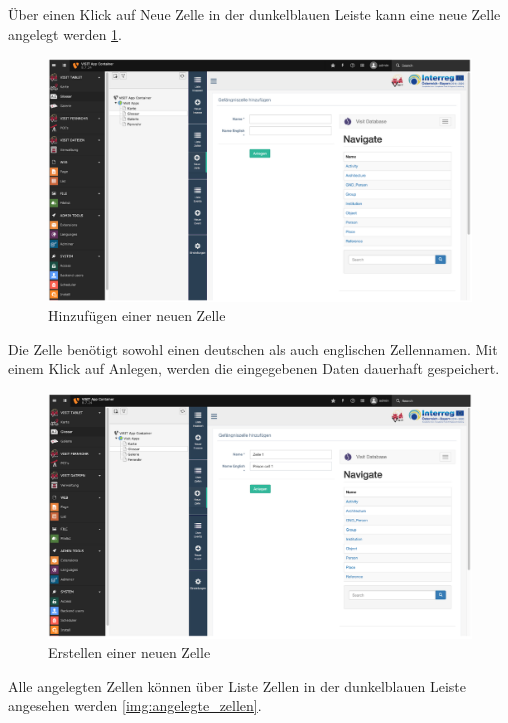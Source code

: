 Über einen Klick auf Neue Zelle in der dunkelblauen Leiste kann eine neue Zelle angelegt werden \ref{img:hinzufuegen_neue_zelle}.

\begin{figure}[ht!]
\centering
\includegraphics[width=12cm]{Figures/paula/glossar/hinzufuegen_neue_zelle.png}
\caption{Hinzufügen einer neuen Zelle}
\label{img:hinzufuegen_neue_zelle}
\end{figure}

Die Zelle benötigt sowohl einen deutschen als auch englischen Zellennamen. Mit einem Klick auf Anlegen, werden die eingegebenen Daten dauerhaft gespeichert. 
\begin{figure}[ht!]
\centering
\includegraphics[width=12cm]{Figures/paula/glossar/neue_zelle_erstellen.png}
\caption{Erstellen einer neuen Zelle}
\label{img:neue_zelle}
\end{figure}

Alle angelegten Zellen können über Liste Zellen in der dunkelblauen Leiste angesehen werden \ref{img:angelegte_zellen}.

